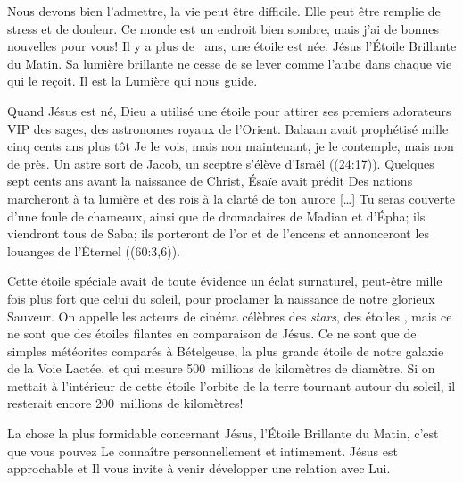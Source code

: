 


Nous devons bien l'admettre, la vie peut être difficile. Elle peut être remplie de stress et de douleur. Ce monde est un endroit bien sombre, mais j'ai de bonnes nouvelles pour vous! Il y a plus de ~ans, une étoile est née, Jésus l'Étoile Brillante du Matin. Sa lumière brillante ne cesse de se lever comme l'aube dans chaque vie qui le reçoit. Il est la Lumière qui nous guide.

Quand Jésus est né, Dieu a utilisé une étoile pour attirer ses premiers adorateurs \Og VIP \Fg{} \ocadr des sages, des astronomes royaux de l'Orient. Balaam avait prophétisé mille cinq cents ans plus tôt\frcolon{}
\Og Je le vois, mais non maintenant, je le contemple, mais non de près. Un astre sort de Jacob, un sceptre s’élève d’Israël \Fg{} ((24:17)).
Quelques sept cents ans avant la naissance de Christ, Ésaïe avait prédit\frcolon{}
\Og Des nations marcheront à ta lumière et des rois à la clarté de ton aurore [\dots{}] Tu seras couverte d’une foule de chameaux, ainsi que de dromadaires de Madian et d’Épha; ils viendront tous de Saba; ils porteront de l’or et de l’encens et annonceront les louanges de l’Éternel \Fg{} ((60:3,6)).

Cette étoile spéciale avait de toute évidence un éclat surnaturel, peut-être mille fois plus fort que celui du soleil, pour proclamer la naissance de notre glorieux Sauveur. On appelle les acteurs de cinéma célèbres des \emph{stars}, des \Og étoiles \Fg{}, mais ce ne sont que des étoiles filantes en comparaison de Jésus. Ce ne sont que de simples météorites comparés à Bételgeuse, la plus grande étoile de notre galaxie de la Voie Lactée, et qui mesure 500~millions de kilomètres de diamètre. Si on mettait à l'intérieur de cette étoile l'orbite de la terre tournant autour du soleil, il resterait encore 200~millions de kilomètres!

La chose la plus formidable concernant Jésus, l'Étoile Brillante du Matin, c'est que vous pouvez Le connaître personnellement et intimement. Jésus est approchable et Il vous invite à venir développer une relation avec Lui.


\begin{dvquotes}
\end{dvquotes}
             
       
